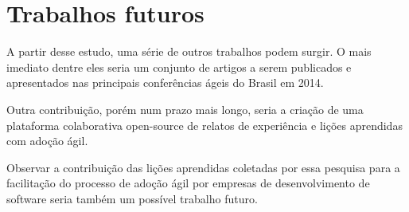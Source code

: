 \section{Trabalhos futuros}

A partir desse estudo, uma série de outros trabalhos podem surgir. O mais imediato dentre eles seria um conjunto de artigos a serem publicados e apresentados nas principais conferências ágeis do Brasil em 2014.

Outra contribuição, porém num prazo mais longo, seria a criação de uma plataforma colaborativa open-source de relatos de experiência e lições aprendidas com adoção ágil.

Observar a contribuição das lições aprendidas coletadas por essa pesquisa para a facilitação do processo de adoção ágil por empresas de desenvolvimento de software seria também um possível trabalho futuro.
